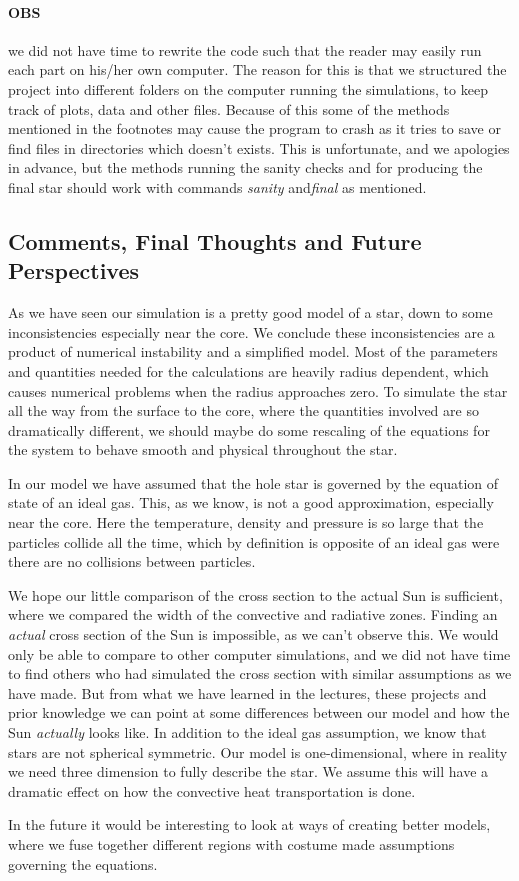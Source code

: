 \documentclass[11pt,a4paper,twocolumn,titlepage]{article}
\begin{document}
\paragraph{OBS} we did not have time to rewrite the code such that the reader may easily run each part on his/her own computer. The reason for this is that we structured the project into different folders on the computer running the simulations, to keep track of plots, data and other files. Because of this some of the methods mentioned in the footnotes may cause the program to crash as it tries to save or find files in directories which doesn't exists. This is unfortunate, and we apologies in advance, but the methods running the sanity checks and for producing the final star should work with commands \textit{sanity} and\textit{final} as mentioned.

\subsection{Comments, Final Thoughts and Future Perspectives}\label{subsec:Conclusion/Comments}
As we have seen our simulation is a pretty good model of a star, down to some inconsistencies especially near the core. We conclude these inconsistencies are a product of numerical instability and a simplified model. Most of the parameters and quantities needed for the calculations are heavily radius dependent, which causes numerical problems when the radius approaches zero. To simulate the star all the way from the surface to the core, where the quantities involved are so dramatically different, we should maybe do some rescaling of the equations for the system to behave smooth and physical throughout the star.

In our model we have assumed that the hole star is governed by the equation of state of an ideal gas. This, as we know, is not a good approximation, especially near the core. Here the temperature, density and pressure is so large that the particles collide all the time, which by definition is opposite of an ideal gas were there are no collisions between particles.

We hope our little comparison of the cross section to the actual Sun is sufficient, where we compared the width of the convective and radiative zones. Finding an \textit{actual} cross section of the Sun is impossible, as we can't observe this. We would only be able to compare to other computer simulations, and we did not have time to find others who had simulated the cross section with similar assumptions as we have made. But from what we have learned in the lectures, these projects and prior knowledge we can point at some differences between our model and how the Sun \textit{actually} looks like. In addition to the ideal gas assumption, we know that stars are not spherical symmetric. Our model is one-dimensional, where in reality we need three dimension to fully describe the star. We assume this will have a dramatic effect on how the convective heat transportation is done.

In the future it would be interesting to look at ways of creating better models, where we fuse together different regions with costume made assumptions governing the equations.


\end{document}
